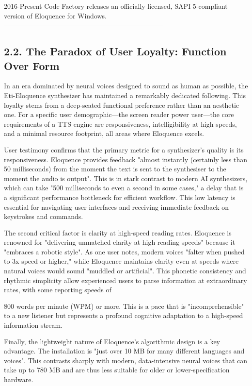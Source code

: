   2016-Present                        Code Factory releases an officially
                                      licensed, SAPI 5-compliant version
                                      of Eloquence for Windows.\supercite{9}
  -----------------------------------------------------------------------

\subsection{2.2. The Paradox of User Loyalty: Function Over Form}
In an era dominated by neural voices designed to sound as human as
possible, the Eti-Eloquence synthesizer has maintained a remarkably
dedicated following. This loyalty stems from a deep-seated functional
preference rather than an aesthetic one. For a specific user
demographic---the screen reader power user---the core requirements of a
TTS engine are responsiveness, intelligibility at high speeds, and a
minimal resource footprint, all areas where Eloquence excels.

User testimony confirms that the primary metric for a synthesizer's
quality is its responsiveness. Eloquence provides feedback "almost
instantly (certainly less than 50 milliseconds) from the moment the text
is sent to the synthesiser to the moment the audio is output".\supercite{6} This
is in stark contrast to modern AI synthesizers, which can take "500
milliseconds to even a second in some cases," a delay that is a
significant performance bottleneck for efficient workflow.\supercite{6} This low
latency is essential for navigating user interfaces and receiving
immediate feedback on keystrokes and commands.\supercite{10}

The second critical factor is clarity at high-speed reading rates.
Eloquence is renowned for "delivering unmatched clarity at high reading
speeds" because it "embraces a robotic style".\supercite{11} As one user notes,
modern voices "falter when pushed to 3x speed or higher," while
Eloquence maintains clarity even at speeds where natural voices would
sound "muddled or artificial".\supercite{6} This phonetic consistency and
rhythmic simplicity allow experienced users to parse information at
extraordinary rates, with some reporting speeds of

800 words per minute (WPM) or more.\supercite{10} This is a pace that is
"incomprehensible" to a new listener but represents a profound
cognitive adaptation to a high-speed information stream.\supercite{12}

Finally, the lightweight nature of Eloquence's algorithmic design is a
key advantage. The installation is "just over 10 MB for many different
languages and voices".\supercite{6} This contrasts sharply with modern,
data-intensive neural voices that can take up to 780 MB and are thus
less suitable for older or lower-specification hardware.\supercite{6}

